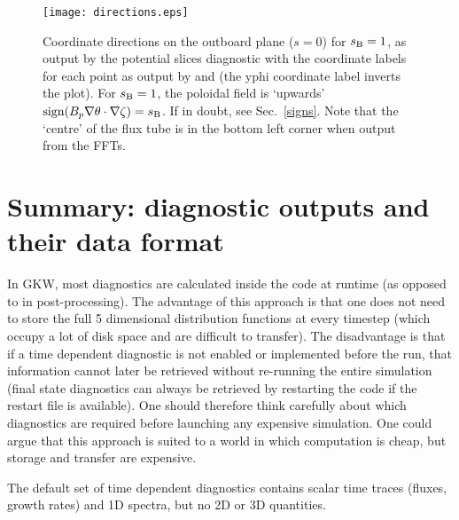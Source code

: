 \begin{figure}[hp]
 
 \begin{center}
 \texttt{[image: directions.eps]}
 \caption{\label{directions}Coordinate directions on the outboard
   plane ($s=0$) for $s_{\rm B}=1$, as output by the potential slices
   diagnostic  with the coordinate labels for each point
   as output by  and  (the yphi coordinate label
   inverts the plot). For $s_{\rm B}=1$, the poloidal field is
   `upwards' ${\rm sign}(B_p \nabla \theta \cdot \nabla \zeta)= s_{\rm
     B}$. If in doubt, see Sec.~\ref{signs}.  Note that the `centre'
   of the flux tube is in the bottom left corner when output from the
   FFTs.}
 \end{center}
 \end{figure}


\section{Summary: diagnostic outputs and their data format}
\label{sec.diagnos-data-format}

In GKW, most diagnostics are calculated inside the code at runtime (as
opposed to in post-processing).  The advantage of this approach is
that one does not need to store the full 5 dimensional distribution
functions at every timestep (which occupy a lot of disk space and are
difficult to transfer).  The disadvantage is that if a time dependent
diagnostic is not enabled or implemented before the run, that
information cannot later be retrieved without re-running the entire
simulation (final state diagnostics can always be retrieved by
restarting the code if the restart file is available).  One should
therefore think carefully about which diagnostics are required before
launching any expensive simulation.  One could argue that this
approach is suited to a world in which computation is cheap, but
storage and transfer are expensive.

The default set of time dependent diagnostics contains scalar time
traces (fluxes, growth rates) and 1D spectra, but no 2D or 3D
quantities.

